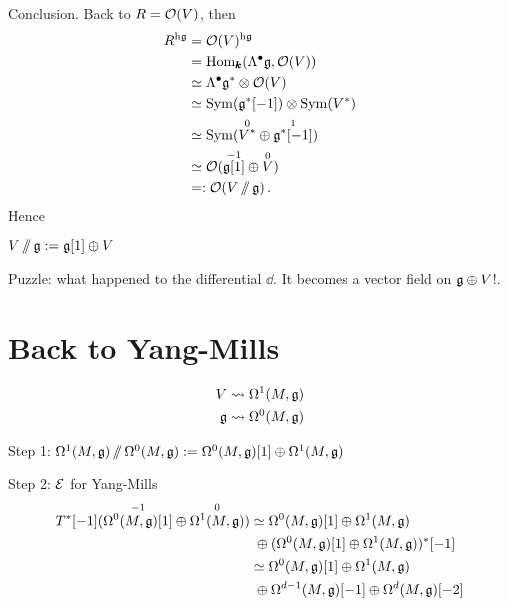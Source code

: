 Conclusion. Back to $R=\mathcal{O} (V)$, then
\begin{align*}
  R^{\mathrm{h}\mathfrak{g}}&=\mathcal{O} (V)^{\mathrm{h}\mathfrak{g}}\\
                      &=\mathrm{Hom}_{\pmb{k}} (\Lambda^\bullet\mathfrak{g},\mathcal{O} (V))\\
                      &\simeq\Lambda^\bullet\mathfrak{g}^*\otimes\mathcal{O} (V)\\
                      &\simeq\operatorname{Sym} (\mathfrak{g}^*[-1])\otimes\operatorname{Sym} (V^*)\\
                      &\simeq\operatorname{Sym} (\overset{0}{V^*}\oplus\overset{1}{\mathfrak{g}^*[-1]})\\
                      &\simeq\mathcal{O} (\overset{-1}{\mathfrak{g}[1]}\oplus \overset{0}{V})\\
                      &=:\mathcal{O} (V\operatorname{/\mkern-6mu/}\mathfrak{g})\,.
\end{align*}
Hence
\begin{definition}
  $V\operatorname{/\mkern-6mu/}\mathfrak{g}:=\mathfrak{g}[1]\oplus{}V$
\end{definition}

Puzzle: what happened to the differential
$\dd$. It becomes a vector field on $\mathfrak{g}\oplus{}V$!.

\section{Back to Yang-Mills}

\begin{align*}
  V&\rightsquigarrow\Omega^1 (M,\mathfrak{g})\\
  \mathfrak{g}&\rightsquigarrow\Omega^0 (M,\mathfrak{g})
\end{align*}

Step 1: $\Omega^1 (M,\mathfrak{g})\operatorname{/\mkern-6mu/}\Omega^0 (M,\mathfrak{g}):=\Omega^0 (M,\mathfrak{g})[1]\oplus\Omega^1 (M,\mathfrak{g})$

Step 2: $\mathcal{E}$ for Yang-Mills
\begin{align*}
  T^*[-1] (\overset{-1}{\Omega^0 (M,\mathfrak{g})[1]}\oplus{}\overset{0}{\Omega^1 (M,\mathfrak{g})})
  &\simeq\Omega^0 (M,\mathfrak{g})[1]\oplus\Omega^1 (M,\mathfrak{g})\\
  &\;\oplus (\Omega^0 (M,\mathfrak{g})[1]\oplus\Omega^1 (M,\mathfrak{g}))^*[-1]\\
  &\simeq\Omega^0 (M,\mathfrak{g})[1]\oplus\Omega^1 (M,\mathfrak{g})\\
  &\;\oplus\Omega^{d-1} (M,\mathfrak{g})[-1]\oplus\Omega^d (M,\mathfrak{g})[-2]
\end{align*}
